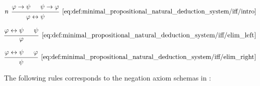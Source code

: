 \begin{definition}
\begin{thmenum}
    \begin{minipage}{0.3\textwidth}
      \begin{equation*}\taglabel[\( \leftrightarrow^+ \)]{eq:def:minimal_propositional_natural_deduction_system/iff/intro}
        \begin{prooftree}
          \hypo{ \varphi \rightarrow \psi }
          \hypo{ \psi \rightarrow \varphi }
          \infer[left label=\( n \)]2[\ref{eq:def:minimal_propositional_natural_deduction_system/iff/intro}]{ \varphi \leftrightarrow \psi }
        \end{prooftree}
      \end{equation*}
    \end{minipage}
    \hfill
    \begin{minipage}{0.3\textwidth}
      \begin{equation*}\taglabel[\( \leftrightarrow^{-_L} \)]{eq:def:minimal_propositional_natural_deduction_system/iff/elim_left}
        \begin{prooftree}
          \hypo{ \varphi \leftrightarrow \psi }
          \hypo{ \psi }
          \infer2[\ref{eq:def:minimal_propositional_natural_deduction_system/iff/elim_left}]{ \varphi }
        \end{prooftree}
      \end{equation*}
    \end{minipage}
    \hfill
    \begin{minipage}{0.3\textwidth}
      \begin{equation*}\taglabel[\( \leftrightarrow^{-_R} \)]{eq:def:minimal_propositional_natural_deduction_system/iff/elim_right}
        \begin{prooftree}
          \hypo{ \varphi \leftrightarrow \psi }
          \hypo{ \varphi }
          \infer2[\ref{eq:def:minimal_propositional_natural_deduction_system/iff/elim_right}]{ \psi }
        \end{prooftree}
      \end{equation*}
    \end{minipage}

     The following rules corresponds to the negation axiom schemas in :


\end{thmenum}
\end{definition}
